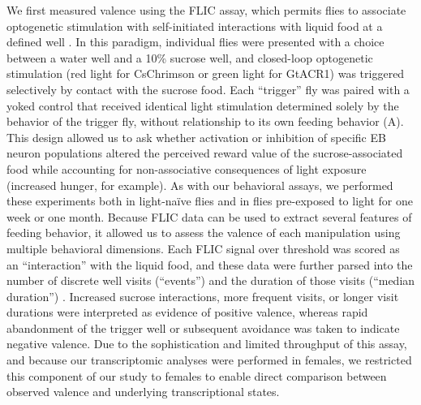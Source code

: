 We first measured valence using the FLIC assay, which permits flies to associate optogenetic stimulation with self-initiated interactions with liquid food at a defined well \citep{ro2014}. 
In this paradigm, individual flies were presented with a choice between a water well and a 10\% sucrose well, and closed-loop optogenetic stimulation (red light for CsChrimson or green light for GtACR1) was triggered selectively by contact with the sucrose food. 
Each “trigger” fly was paired with a yoked control that received identical light stimulation determined solely by the behavior of the trigger fly, without relationship to its own feeding behavior (A). 
This design allowed us to ask whether activation or inhibition of specific EB neuron populations altered the perceived reward value of the sucrose-associated food while accounting for non-associative consequences of light exposure (increased hunger, for example). 
As with our behavioral assays, we performed these experiments both in light-naïve flies and in flies pre-exposed to light for one week or one month. 
Because FLIC data can be used to extract several features of feeding behavior, it allowed us to assess the valence of each manipulation using multiple behavioral dimensions. 
Each FLIC signal over threshold was scored as an “interaction” with the liquid food, and these data were further parsed into the number of discrete well visits (“events”) and the duration of those visits (“median duration”) \citep{weaver2023b}. 
Increased sucrose interactions, more frequent visits, or longer visit durations were interpreted as evidence of positive valence, whereas rapid abandonment of the trigger well or subsequent avoidance was taken to indicate negative valence. 
Due to the sophistication and limited throughput of this assay, and because our transcriptomic analyses were performed in females, we restricted this component of our study to females to enable direct comparison between observed valence and underlying transcriptional states.

